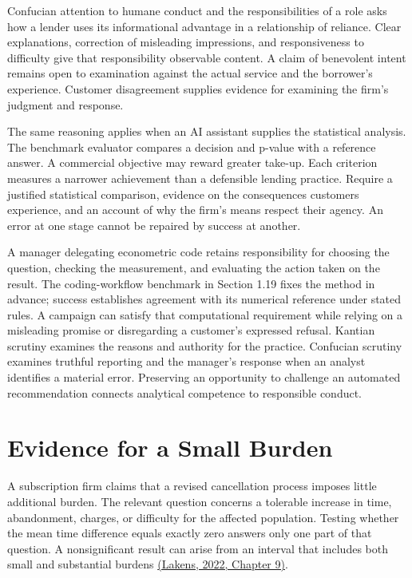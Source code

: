 Confucian attention to humane conduct and the responsibilities of a role
asks how a lender uses its informational advantage in a relationship of
reliance. Clear explanations, correction of misleading impressions, and
responsiveness to difficulty give that responsibility observable
content. A claim of benevolent intent remains open to examination
against the actual service and the borrower's experience. Customer
disagreement supplies evidence for examining the firm's judgment and
response.

The same reasoning applies when an AI assistant supplies the statistical
analysis. The benchmark evaluator compares a decision and p-value with a
reference answer. A commercial objective may reward greater take-up.
Each criterion measures a narrower achievement than a defensible lending
practice. Require a justified statistical comparison, evidence on the
consequences customers experience, and an account of why the firm's
means respect their agency. An error at one stage cannot be repaired by
success at another.

A manager delegating econometric code retains responsibility for
choosing the question, checking the measurement, and evaluating the
action taken on the result. The coding-workflow benchmark in Section
1.19 fixes the method in advance; success establishes agreement with its
numerical reference under stated rules. A campaign can satisfy that
computational requirement while relying on a misleading promise or
disregarding a customer's expressed refusal. Kantian scrutiny examines
the reasons and authority for the practice. Confucian scrutiny examines
truthful reporting and the manager's response when an analyst identifies
a material error. Preserving an opportunity to challenge an automated
recommendation connects analytical competence to responsible conduct.


\hypertarget{M09-evidence-for-a-small-burden}{%
\section{Evidence for a Small
Burden}\label{M09-evidence-for-a-small-burden}}

\noindent \noindent A subscription firm claims that a revised cancellation process
imposes little additional burden. The relevant question concerns a
tolerable increase in time, abandonment, charges, or difficulty for the
affected population. Testing whether the mean time difference equals
exactly zero answers only one part of that question. A nonsignificant
result can arise from an interval that includes both small and
substantial burdens
\href{https://lakens.github.io/statistical_inferences/09-equivalencetest.html}{(Lakens,
2022, Chapter 9)}.


